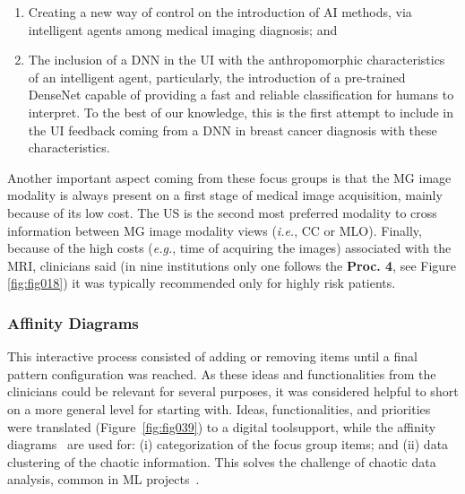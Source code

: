 \begin{enumerate}
\item Creating a new way of control on the introduction of \ac{AI} methods, via intelligent agents among medical imaging diagnosis; and
\item The inclusion of a \ac{DNN} in the \ac{UI} with the anthropomorphic characteristics of an intelligent agent, particularly, the introduction of a pre-trained DenseNet capable of providing a fast and reliable classification for humans to interpret.
To the best of our knowledge, this is the first attempt to include in the \ac{UI} feedback coming from a \ac{DNN} in breast cancer diagnosis with these characteristics.
\end{enumerate}

\vspace{0.50mm}

Another important aspect coming from these focus groups is that the \ac{MG} image modality is always present on a first stage of medical image acquisition, mainly because of its low cost.
The \ac{US} is the second most preferred modality to cross information between \ac{MG} image modality views ({\it i.e.}, \ac{CC} or \ac{MLO}).
Finally, because of the high costs ({\it e.g.}, time of acquiring the images) associated with the \ac{MRI}, clinicians said (in nine institutions only one follows the {\bf Proc. 4}, see Figure \ref{fig:fig018}) it was typically recommended only for highly risk patients.

\subsubsection{Affinity Diagrams}
\label{sec:chap005003003003}

This interactive process consisted of adding or removing items until a final pattern configuration was reached.
As these ideas and functionalities from the clinicians could be relevant for several purposes, it was considered helpful to short on a more general level for starting with.
Ideas, functionalities, and priorities were translated (Figure~\ref{fig:fig039}) to a digital tool\footnotemark[7] support, while the affinity diagrams~\cite{10.1145/3290605.3300628} are used for:
(i) categorization of the focus group items; and
(ii) data clustering of the chaotic information.
This solves the challenge of chaotic data analysis, common in \ac{ML} projects~\cite{10.1145/2858036.2858373, 10.1145/3343413.3377983}.

